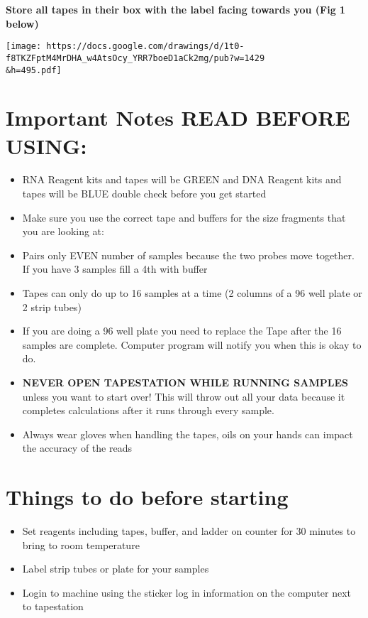 \documentclass[
  letterpaper,
  DIV=11,
  numbers=noendperiod]{scrreprt}
\begin{document}
\textbf{Store all tapes in their box with the label facing towards you
(Fig 1 below)}

\texttt{[image: https://docs.google.com/drawings/d/1t0-f8TKZFptM4MrDHA\_w4AtsOcy\_YRR7boeD1aCk2mg/pub?w=1429\\\&h=495.pdf]}

\hypertarget{important-notes-read-before-using}{%
\section*{\texorpdfstring{\textbf{Important Notes READ BEFORE
USING:}}{Important Notes READ BEFORE USING:}}\label{important-notes-read-before-using}}

\begin{itemize}
\item
  RNA Reagent kits and tapes will be GREEN and DNA Reagent kits and
  tapes will be BLUE double check before you get started
\item
  Make sure you use the correct tape and buffers for the size fragments
  that you are looking at:
\item
  Pairs only EVEN number of samples because the two probes move
  together. If you have 3 samples fill a 4th with buffer
\item
  Tapes can only do up to 16 samples at a time (2 columns of a 96 well
  plate or 2 strip tubes)
\item
  If you are doing a 96 well plate you need to replace the Tape after
  the 16 samples are complete. Computer program will notify you when
  this is okay to do.
\item
  \textbf{NEVER OPEN TAPESTATION WHILE RUNNING SAMPLES} unless you want
  to start over! This will throw out all your data because it completes
  calculations after it runs through every sample.
\item
  Always wear gloves when handling the tapes, oils on your hands can
  impact the accuracy of the reads
\end{itemize}

\hypertarget{things-to-do-before-starting}{%
\section*{\texorpdfstring{\textbf{Things to do before
starting}}{Things to do before starting}}\label{things-to-do-before-starting}}

\begin{itemize}
\item
  Set reagents including tapes, buffer, and ladder on counter for 30
  minutes to bring to room temperature
\item
  Label strip tubes or plate for your samples
\item
  Login to machine using the sticker log in information on the computer
  next to tapestation
\end{itemize}
\end{document}
